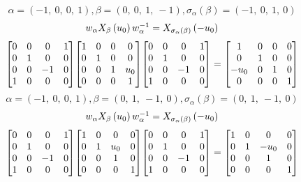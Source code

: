 \documentclass[11pt]{article}
\theoremstyle{definition}
\begin{document}
\[
\alpha = \left( -1, \  0, \  0, \  1\right), \beta = \left( 0, \  0, \  1, \  -1\right), \sigma_{\alpha}(\beta) = \left( -1, \  0, \  1, \  0\right)
\]
\[
\scaletoalign{\textwidth}{w_{\alpha} X_{\beta}\left(u_{0}\right) w_{\alpha}^{-1} = X_{\sigma_{\alpha}\left(\beta\right)}\left(- u_{0}\right)}
\]
\[
\scaletoalign{\textwidth}{{\left[\begin{matrix}0 & 0 & 0 & 1\\0 & 1 & 0 & 0\\0 & 0 & -1 & 0\\1 & 0 & 0 & 0\end{matrix}\right]} {\left[\begin{matrix}1 & 0 & 0 & 0\\0 & 1 & 0 & 0\\0 & 0 & 1 & u_{0}\\0 & 0 & 0 & 1\end{matrix}\right]} {\left[\begin{matrix}0 & 0 & 0 & 1\\0 & 1 & 0 & 0\\0 & 0 & -1 & 0\\1 & 0 & 0 & 0\end{matrix}\right]} = {\left[\begin{matrix}1 & 0 & 0 & 0\\0 & 1 & 0 & 0\\- u_{0} & 0 & 1 & 0\\0 & 0 & 0 & 1\end{matrix}\right]}}
\]
\[
\alpha = \left( -1, \  0, \  0, \  1\right), \beta = \left( 0, \  1, \  -1, \  0\right), \sigma_{\alpha}(\beta) = \left( 0, \  1, \  -1, \  0\right)
\]
\[
\scaletoalign{\textwidth}{w_{\alpha} X_{\beta}\left(u_{0}\right) w_{\alpha}^{-1} = X_{\sigma_{\alpha}\left(\beta\right)}\left(- u_{0}\right)}
\]
\[
\scaletoalign{\textwidth}{{\left[\begin{matrix}0 & 0 & 0 & 1\\0 & 1 & 0 & 0\\0 & 0 & -1 & 0\\1 & 0 & 0 & 0\end{matrix}\right]} {\left[\begin{matrix}1 & 0 & 0 & 0\\0 & 1 & u_{0} & 0\\0 & 0 & 1 & 0\\0 & 0 & 0 & 1\end{matrix}\right]} {\left[\begin{matrix}0 & 0 & 0 & 1\\0 & 1 & 0 & 0\\0 & 0 & -1 & 0\\1 & 0 & 0 & 0\end{matrix}\right]} = {\left[\begin{matrix}1 & 0 & 0 & 0\\0 & 1 & - u_{0} & 0\\0 & 0 & 1 & 0\\0 & 0 & 0 & 1\end{matrix}\right]}}
\]
\end{document}
